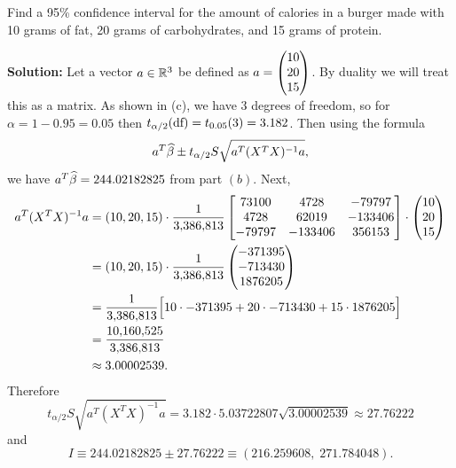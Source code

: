 Find a 95\% confidence interval for the amount of calories in a burger made with 10 grams of fat, 20 grams of carbohydrates, and 15 grams of protein.

\nnl \textbf{Solution: } Let a vector $a \in \mathbb{R}^3$ be defined as $a = \displaystyle \vvec{10}{20}{15}$. By duality we will treat this as a matrix. As shown in (c), we have 3 degrees of freedom, so for $\alpha = 1 - 0.95 = 0.05$ then $t_{\alpha/2}(\text{df}) = t_{0.05}(3) = 3.182$. Then using the formula 
$$a^T \widehat{\beta} \pm t_{\alpha/2} S \sqrt{a^T(X^TX)^{-1}a},$$
we have $a^T \widehat{\beta} = 244.02182825$ from part $(b)$. Next, 
\begin{align*}
    a^T(X^TX)^{-1}a &= (10, 20, 15) \cdot \over*{\num{3386813}} \begin{bmatrix}
        73100 & 4728 & -79797\\
        4728 & 62019 & -133406\\
        -79797 & -133406 & 356153
    \end{bmatrix} \cdot \vvec{10}{20}{15}\\
    &= (10, 20, 15) \cdot \over*{\num{3386813}} \vvec{-371395}{-713430}{1876205}\\
    &= \over*{\num{3386813}} \Bigbrac{ 10 \cdot -371395 +  20 \cdot -713430 + 15 \cdot 1876205}\\
    &= \frac{\num{10160525}}{\num{3386813}}
    \\ & \approx 3.00002539.
\end{align*}
Therefore
$$t_{\alpha/2} S \sqrt{a^T(X^TX)^{-1}a} = 3.182 \cdot 5.03722807 \sqrt{3.00002539} \approx 27.76222$$
and
$$I \equiv 244.02182825 \pm 27.76222 \equiv (216.259608,\; 271.784048).$$